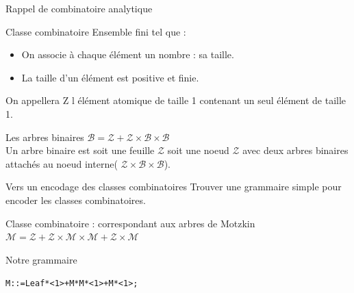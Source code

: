 \documentclass{beamer}
\begin{document}
\begin{frame}{Rappel de combinatoire analytique}
\begin{block}{Classe combinatoire}
Ensemble fini tel que : \\
\begin{itemize}
\item  On associe à chaque élément un nombre : sa taille.
\item La taille d'un élément est positive et finie.
\end{itemize}

On appellera Z l élément atomique de taille 1 contenant un seul élément de taille 1.
\end{block}
\begin{exampleblock}{Les arbres binaires}
$\mathcal{B} = \mathcal{Z} + \mathcal{Z} \times \mathcal{B} \times \mathcal{B}$ \\
Un arbre binaire est soit une feuille $\mathcal{Z}$ soit une noeud $\mathcal{Z}$ avec deux arbres binaires attachés au noeud interne( $\mathcal{Z} \times \mathcal{B} \times \mathcal{B}$).
\end{exampleblock}
\end{frame}



\begin{frame}{Vers un encodage des classes combinatoires }
Trouver une grammaire simple pour encoder les classes combinatoires. \newline
\begin{block}{Classe combinatoire : correspondant aux arbres de Motzkin}
\center
$\mathcal{M} = \mathcal{Z} + \mathcal{Z} \times \mathcal{M} \times \mathcal{M} + \mathcal{Z} \times \mathcal{M}$ \\  %
\end{block}
\vspace{0.5cm}
\begin{block}{Notre grammaire}
\begin{alltt}
\center
M ::= Leaf * <1> + M * M * <1> + M * <1>;
\end{alltt}
\end{block}
\end{frame}
\end{document}

